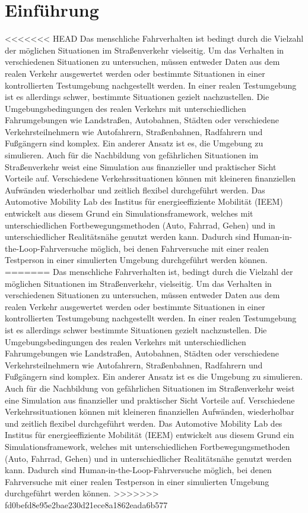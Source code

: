 \chapter{Einführung}
\label{sec:einführung}

<<<<<<< HEAD
Das menschliche Fahrverhalten ist bedingt durch die Vielzahl der möglichen Situationen im Straßenverkehr vielseitig. Um das Verhalten in verschiedenen Situationen zu untersuchen, müssen entweder Daten aus dem realen Verkehr ausgewertet werden oder bestimmte Situationen in einer kontrollierten Testumgebung nachgestellt werden. In einer realen Testumgebung ist es allerdings schwer, bestimmte Situationen gezielt nachzustellen. Die Umgebungsbedingungen des realen Verkehrs mit unterschiedlichen Fahrumgebungen wie Landstraßen, Autobahnen, Städten oder verschiedene Verkehrsteilnehmern wie Autofahrern, Straßenbahnen, Radfahrern und Fußgängern sind komplex. Ein anderer Ansatz ist es, die Umgebung zu simulieren. Auch für die Nachbildung von gefährlichen Situationen im Straßenverkehr weist eine Simulation aus finanzieller und praktischer Sicht Vorteile auf. Verschiedene Verkehrssituationen können mit kleineren finanziellen Aufwänden wiederholbar und zeitlich flexibel durchgeführt werden. Das Automotive Mobility Lab des Institus für energieeffiziente Mobilität ({\acs{IEEM}}) entwickelt aus diesem Grund ein Simulationsframework, welches mit unterschiedlichen Fortbewegungsmethoden (Auto, Fahrrad, Gehen) und in unterschiedlicher Realitätsnähe genutzt werden kann. Dadurch sind \Gls{Human-in-the-Loop}-Fahrversuche möglich, bei denen Fahrversuche mit einer realen Testperson in einer simulierten Umgebung durchgeführt werden können.  
=======
Das menschliche Fahrverhalten ist, bedingt durch die Vielzahl der möglichen Situationen im Straßenverkehr, vielseitig. Um das Verhalten in verschiedenen Situationen zu untersuchen, müssen entweder Daten aus dem realen Verkehr ausgewertet werden oder bestimmte Situationen in einer kontrollierten Testumgebung nachgestellt werden. In einer realen Testumgebung ist es allerdings schwer bestimmte Situationen gezielt nachzustellen. Die Umgebungsbedingungen des realen Verkehrs mit unterschiedlichen Fahrumgebungen wie Landstraßen, Autobahnen, Städten oder verschiedene Verkehrsteilnehmern wie Autofahrern, Straßenbahnen, Radfahrern und Fußgängern sind komplex. Ein anderer Ansatz ist es die Umgebung zu simulieren. Auch für die Nachbildung von gefährlichen Situationen im Straßenverkehr weist eine Simulation aus finanzieller und praktischer Sicht Vorteile auf. Verschiedene Verkehrssituationen können mit kleineren finanziellen Aufwänden, wiederholbar und zeitlich flexibel durchgeführt werden. Das Automotive Mobility Lab des Institus für energieeffiziente Mobilität ({\acs{IEEM}}) entwickelt aus diesem Grund ein Simulationsframework, welches mit unterschiedlichen Fortbewegungsmethoden (Auto, Fahrrad, Gehen) und in unterschiedlicher Realitätsnähe genutzt werden kann. Dadurch sind \Gls{Human-in-the-Loop}-Fahrversuche möglich, bei denen Fahrversuche mit einer realen Testperson in einer simulierten Umgebung durchgeführt werden können.  
>>>>>>> fd0befd8e95e2bae230d21ece8a1862eada6b577

